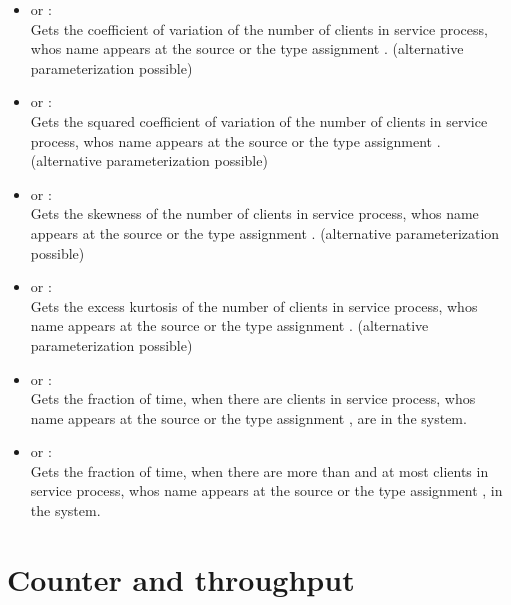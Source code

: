\begin{itemize}
\item
{} or :\\
Gets the coefficient of variation of the number of clients in service process, whos name appears at the source or the type assignment .
(alternative parameterization possible)

\item
{} or :\\
Gets the squared coefficient of variation of the number of clients in service process, whos name appears at the source or the type assignment .
(alternative parameterization possible)

\item
{} or :\\
Gets the skewness of the number of clients in service process, whos name appears at the source or the type assignment .
(alternative parameterization possible)

\item
{} or :\\
Gets the excess kurtosis of the number of clients in service process, whos name appears at the source or the type assignment .
(alternative parameterization possible)

\item
{} or :\\
Gets the fraction of time, when there are  clients in service process, whos name appears at the source or the type assignment , are in the system.

\item
{} or :\\
Gets the fraction of time, when there are more than  and at most  clients in service process, whos name appears at the source or the type assignment , in the system.

\end{itemize}





\section{Counter and throughput}

